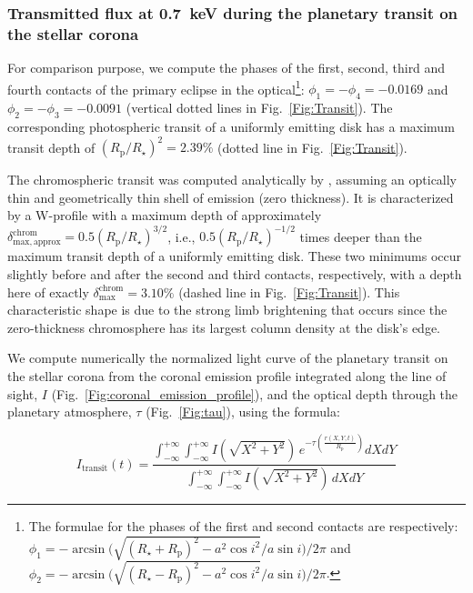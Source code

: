 \documentclass[iop]{emulateapj}
\begin{document}
\subsubsection{Transmitted flux at 0.7~keV during the planetary transit on the stellar corona}
\label{Sect:transit}
For comparison purpose, we compute the phases of the first, second, third and fourth contacts of the primary 
eclipse in the optical\footnote{The formulae for the phases of the first and second contacts are respectively:\\
$\phi_\mathrm{1}=-\arcsin{\!(\sqrt{(R_\star+R_\mathrm{p})^2-a^2\cos{i}^2}/a\sin{i}})/2\pi$ and\\
$\phi_\mathrm{2}=-\arcsin{\!(\sqrt{(R_\star-R_\mathrm{p})^2-a^2\cos{i}^2}/a\sin{i}})/2\pi$.}: 
$\phi_1=-\phi_4=-0.0169$ and $\phi_2=-\phi_3=-0.0091$ (vertical dotted lines in Fig.~\ref{Fig:Transit}).
The corresponding photospheric transit of a uniformly emitting disk \citep[e.g.,][]{Mandel2002} has a maximum transit 
depth of $(R_\mathrm{p}/R_\star)^2=2.39\%$ (dotted line in Fig.~\ref{Fig:Transit}).

The chromospheric transit was computed analytically by \cite{Schlawin2010}, assuming an optically thin 
and geometrically thin shell of emission (zero thickness). It is characterized by a W-profile with a maximum depth 
of approximately $\delta_\mathrm{max,approx}^\mathrm{chrom}=0.5 (R_\mathrm{p}/R_\star)^{3/2}$, i.e., 
$0.5 (R_\mathrm{p}/R_\star)^{-1/2}$ times deeper than the maximum transit depth of a uniformly emitting disk.
These two minimums occur slightly before and after the second and third contacts, respectively, with a depth 
here of exactly $\delta_\mathrm{max}^\mathrm{chrom}=3.10\%$ (dashed line in Fig.~\ref{Fig:Transit}). This 
characteristic shape is due to the strong limb brightening that occurs since the zero-thickness chromosphere 
has its largest column density at the disk's edge.

We compute numerically the normalized light curve of the planetary transit on the stellar corona from 
the coronal emission profile integrated along the line of sight, $I$ (Fig.~\ref{Fig:coronal_emission_profile}), 
and the optical depth through the planetary atmosphere, $\tau$ (Fig.~\ref{Fig:tau}), using the formula:

\begin{equation}
I_\mathrm{transit}(t) = \frac{\int_{-\infty}^{+\infty}\int_{-\infty}^{+\infty} I(\sqrt{X^2+Y^2})\,e^{-\tau\left(\frac{r(X,Y,t)}{R_\mathrm{p}}\right)}dXdY}{\int_{-\infty}^{+\infty}\int_{-\infty}^{+\infty} I(\sqrt{X^2+Y^2})\,dXdY}
\label{Eq:transit}
\end{equation}
\end{document}
